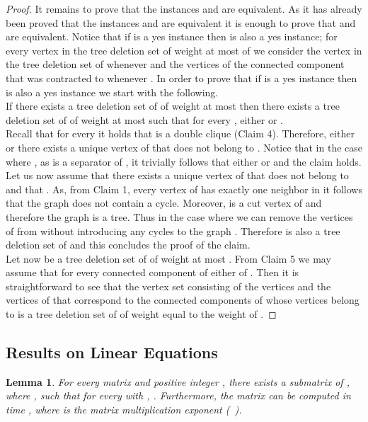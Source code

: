 \documentclass[a4paper,11pt]{article}
\newtheorem{lemma}{Lemma}
\begin{document}
\begin{proof}
\noindent 
It remains to prove that the instances  and  are equivalent. 
As it has already been proved that the instances  and  are equivalent
it is enough to prove that  and  are equivalent.
Notice that if  is a yes instance then  is also a yes instance; for every vertex  in the tree deletion set of weight at most  of 
we consider the vertex  in the tree deletion set of  whenever  
and the vertices of the connected component that was contracted to  whenever .  
In order to prove that if  is a yes instance then  is also a yes instance we start with the 
following. \\

 If there exists a tree deletion set  of  of weight at most  then there exists a tree deletion set  of  
of weight at most  such that for every , either  or .\\

 Recall that for every  
it holds that  is a double clique (Claim 4).
Therefore, either  or there exists a unique vertex of  that does not belong to .
Notice that in the case where , as  is a separator of , 
it trivially follows that either  or  and the claim holds. Let us now assume that there exists a unique vertex  of 
 that does not belong to  and that . As, from Claim 1, every vertex of  has exactly
one neighbor in  it follows that the graph  does not contain a cycle.
Moreover,  is a cut vertex of  and therefore the graph  is a tree.
Thus in the case where  we can remove the vertices of  from  
without introducing any cycles to the graph .
Therefore  is also a tree deletion set of  and this concludes the proof of the claim.
\hfill \\

Let now  be a tree deletion set of  of weight at most . From Claim 5 we may assume that for every connected component  of 
 either  of .
Then it is straightforward to see that the vertex set  consisting of the vertices  and the vertices of  that correspond to the
connected components of  whose vertices belong to  is a tree deletion set of  of weight equal to the weight 
of .
\end{proof}

\subsection{Results on Linear Equations}\label{subsct:lnreqtns}

\begin{lemma}\label{mtrx1lem}
For every matrix  and positive integer , there exists a submatrix  of , 
where , such that for every  with , . 
Furthermore, the matrix  can be computed in time , where  is the matrix multiplication exponent (~\cite{Williams12}).
\end{lemma}
\end{document}
